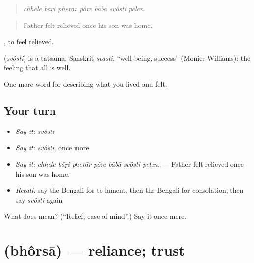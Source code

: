 \begin{quote}
      
\end{quote}

\begin{quote}
\emph{chhele bāṛi pherār pôre bābā svôsti pelen.}
\end{quote}

\begin{quote}
Father felt relieved once his son was home.
\end{quote}

 , to feel relieved.

\begin{cousinweb}
\textbf{} (\emph{svôsti}) is a tatsama, Sanskrit \emph{svasti}, \textquotedblleft{}well-being, success\textquotedblright{} (Monier-Williams): the feeling that all is well.
\end{cousinweb}

\begin{grammarlens}[title={What you've built}]
One more word for describing what you lived and felt.
\end{grammarlens}

\subsection*{Your turn}
\begin{itemize}
\raggedright
  \item \emph{Say it:} \emph{svôsti}
  \item \emph{Say it:} \emph{svôsti}, once more
  \item \emph{Say it:} \emph{chhele bāṛi pherār pôre bābā svôsti pelen.} — Father felt relieved once his son was home.
  \item \emph{Recall:} say the Bengali for to lament, then the Bengali for consolation, then say \emph{svôsti} again
\end{itemize}

\begin{tcolorbox}[breakable,colback=teal!4,colframe=teal!35!black,title={Before you move on}]
What does  mean? (\textquotedblleft{}Relief; ease of mind\textquotedblright{}.) Say it once more.
\end{tcolorbox}
\section[\texorpdfstring{\bn{ভরসা} (bhôrsā)}{ভরসা (bhôrsā)}]{ (bhôrsā) — reliance; trust}

